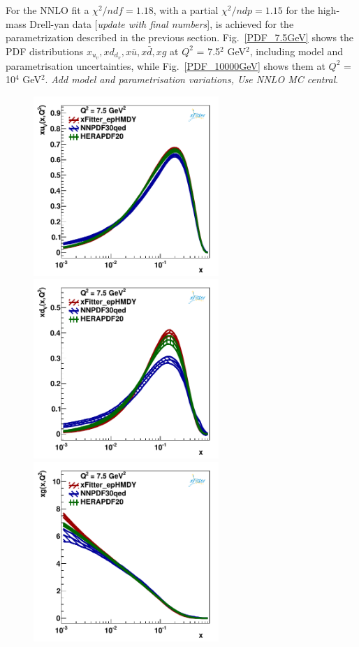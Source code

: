 For the NNLO fit a $\chi^{2}/ndf = 1.18$, with a partial $\chi^2/ndp = 1.15$ for the high-mass Drell-yan data [{\it update with final numbers}], is achieved for the
parametrization described in the previous section.
%
Fig.~\ref{PDF_7.5GeV}
 shows the PDF distributions $x_{u_v},xd_{d_v},x\bar{u}, x\bar{d}, xg$ at $Q^{2}$ = 7.5$^{2}$ GeV$^{2}$,
including model and parametrisation uncertainties, while  Fig.~\ref{PDF_10000GeV} 
shows them at $Q^{2}$ = 10$^{4}$ GeV$^{2}$. {\it Add model and parametrisation variations, Use NNLO MC central}.
\begin{figure}
\includegraphics[width=7cm]{plots/uv_7_5.pdf} 
\includegraphics[width=7cm]{plots/dv_7_5.pdf} 
\includegraphics[width=7cm]{plots/gluon_7_5.pdf} 

\end{figure}
